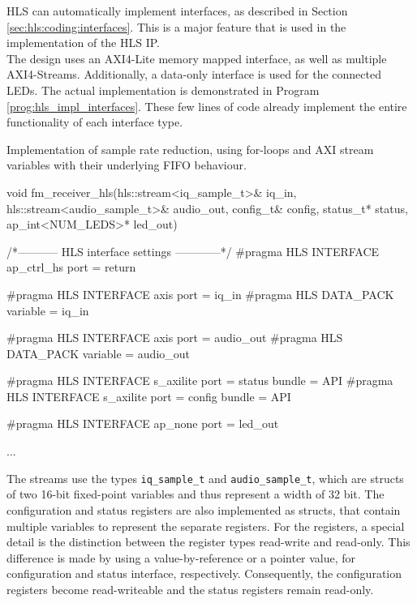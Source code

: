 HLS can automatically implement interfaces, as described in Section \ref{sec:hls:coding:interfaces}.
This is a major feature that is used in the implementation of the HLS IP.\\

The design uses an AXI4-Lite memory mapped interface, as well as multiple AXI4-Streams.
Additionally, a data-only interface is used for the connected LEDs.
The actual implementation is demonstrated in Program \ref{prog:hls_impl_interfaces}.
These few lines of code already implement the entire functionality of each interface type.\\


\begin{program}
  \caption{Implementation of sample rate reduction, using for-loops and AXI stream variables with their underlying FIFO behaviour.}
  \label{prog:hls_impl_interfaces}
\begin{CppCode}
void fm_receiver_hls(hls::stream<iq_sample_t>& iq_in,
                     hls::stream<audio_sample_t>& audio_out,
                     config_t& config,
                     status_t* status,
                     ap_int<NUM_LEDS>* led_out) {

  /*----------- HLS interface settings ------------*/
  #pragma HLS INTERFACE ap_ctrl_hs port = return

  #pragma HLS INTERFACE axis port = iq_in
  #pragma HLS DATA_PACK variable  = iq_in

  #pragma HLS INTERFACE axis port = audio_out
  #pragma HLS DATA_PACK variable  = audio_out

  #pragma HLS INTERFACE s_axilite port = status bundle = API
  #pragma HLS INTERFACE s_axilite port = config bundle = API

  #pragma HLS INTERFACE ap_none port = led_out

  ...
}
\end{CppCode}
\end{program}

The streams use the types \texttt{iq\_sample\_t} and \texttt{audio\_sample\_t}, which are structs of two 16-bit fixed-point variables and thus represent a width of 32 bit.
The configuration and status registers are also implemented as structs, that contain multiple variables to represent the separate registers.
For the registers, a special detail is the distinction between the register types read-write and read-only.
This difference is made by using a value-by-reference or a pointer value, for configuration and status interface, respectively.
Consequently, the configuration registers become read-writeable and the status registers remain read-only.\\

